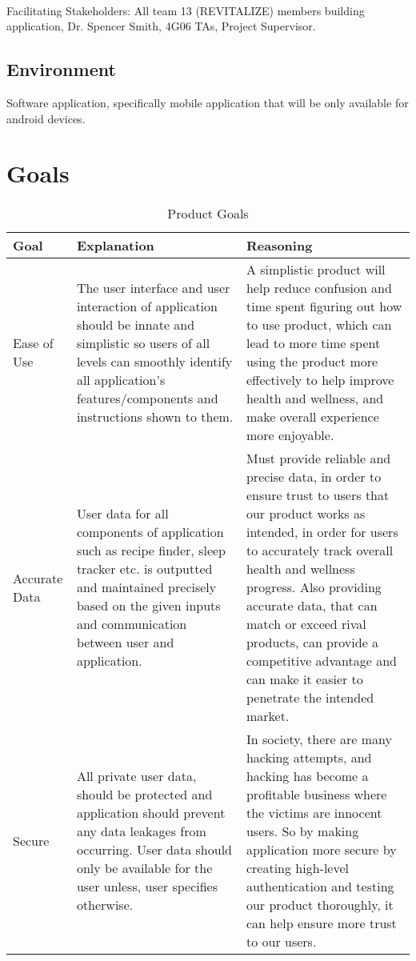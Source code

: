 \documentclass[12pt,letterpaper]{article}
\begin{document}
\noindent
\\
Facilitating Stakeholders: All team 13 (REVITALIZE) members building application, Dr. Spencer Smith, 4G06 TAs, Project Supervisor.

\subsection{Environment}

Software application, specifically mobile application that will be only available for android devices.

\section{Goals}

\begin{longtable}{ |p{3cm}|p{5cm}|p{5cm}| }
 \caption{Product Goals} \\ 
\toprule 
\textbf{Goal} &\textbf{ Explanation} & \textbf{Reasoning}\\
 \midrule
 Ease of Use & The user interface and user interaction of application should be innate and simplistic so users of all levels can smoothly identify all application's features/components and instructions shown to them.    & A simplistic product will help reduce confusion and time spent figuring out how to use product, which can lead to more time spent using the product more effectively to help improve health and wellness, and make overall experience more enjoyable.  \\
 \hline
 Accurate Data & User data for all components of application such as recipe finder, sleep tracker etc. is outputted and maintained precisely based on the given inputs and communication between user and application. & Must provide reliable and precise data, in order to ensure trust to users that our product works as intended, in order for users to accurately track overall health and wellness progress. Also providing accurate data, that can match or exceed rival products, can provide a competitive advantage and can make it easier to penetrate the intended market.\\
 \hline
 Secure & All private user data, should be protected and application should prevent any data leakages from occurring. User data should only be available for the user unless, user specifies otherwise.  & In society, there are many hacking attempts, and hacking has become a profitable business where the victims are innocent users. So by making application more secure by creating high-level authentication and testing our product thoroughly, it can help ensure more trust to our users. \\

\end{longtable}
\end{document}
